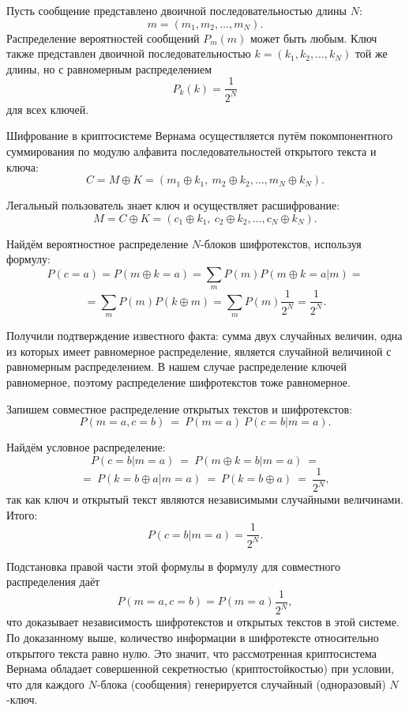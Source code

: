 Пусть сообщение представлено двоичной последовательностью длины $N$:
    \[ m = (m_1, m_2, \dots, m_N). \]
Распределение вероятностей сообщений $P_m(m)$ может быть любым. Ключ также представлен двоичной последовательностью $ k = (k_1, k_2, \dots, k_N)$ той же длины, но с равномерным распределением
    \[ P_k(k) = \frac{1}{2^N} \]
для всех ключей.

Шифрование в криптосистеме Вернама осуществляется путём покомпонентного суммирования по модулю алфавита последовательностей открытого текста и ключа:
    \[ C = M \oplus K = (m_1 \oplus k_1, ~ m_2 \oplus k_2, \dots, m_N \oplus k_N). \]

Легальный пользователь знает ключ и осуществляет расшифрование:
    \[ M =C \oplus K = (c_1 \oplus k_1, ~ c_2 \oplus k_2, \dots, c_N \oplus k_N). \]

Найдём вероятностное распределение $N$-блоков шифротекстов, используя формулу:
    \[ P(c = a) = P(m \oplus k = a) = \sum_{m} P(m) P(m \oplus k = a | m) = \]
    \[ = \sum_{m} P(m) P(k \oplus m) = \sum_{m} P(m) \frac{1}{2^N} = \frac{1}{2^N}. \]

Получили подтверждение известного факта: сумма двух случайных величин, одна из которых имеет равномерное распределение, является случайной величиной с равномерным распределением. В нашем случае распределение ключей равномерное, поэтому распределение шифротекстов тоже равномерное.

Запишем совместное распределение открытых текстов и шифротекстов:
    \[ P(m = a, c = b) ~=~ P(m = a) ~ P(c = b | m = a). \]

Найдём условное распределение:
    \[ P(c = b | m = a) ~=~ P(m \oplus k = b | m = a) ~= \]
    \[ =~ P(k = b \oplus a | m = a) ~=~ P(k = b \oplus a) ~=~ \frac{1}{2^N}, \]
так как ключ и открытый текст являются независимыми случайными величинами. Итого:
    \[ P(c=b | m=a) = \frac{1}{2^N}. \]

Подстановка правой части этой формулы в формулу для совместного распределения даёт
    \[ P(m=a,c=b)=P(m=a)\frac{1}{2^N}, \]
что доказывает независимость шифротекстов и открытых текстов в этой системе. По доказанному выше, количество информации в шифротексте относительно открытого текста равно нулю. Это значит, что рассмотренная криптосистема Вернама обладает совершенной секретностью (криптостойкостью) при условии, что для каждого $N$-блока (сообщения) генерируется случайный (одноразовый) $N$-ключ.



